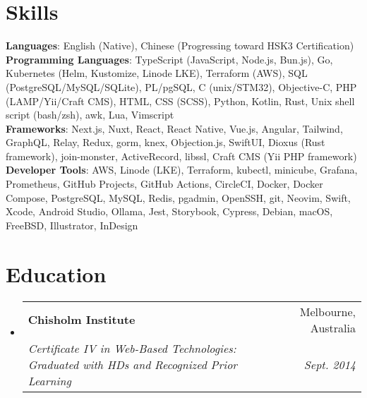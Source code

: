 \documentclass[letterpaper,11pt]{article}
\makeatletter
\newcommand{\resumeSubheading}[4]{
  \vspace{-2pt}\item
    \begin{tabular*}{0.97\textwidth}[t]{l@{\extracolsep{\fill}}r}
      \textbf{#1} & #2 \\
      \textit{\small#3} & \textit{\small #4} \\
    \end{tabular*}\vspace{-6pt}
}
\newcommand{\resumeSubHeadingListStart}{\begin{itemize}[leftmargin=0.15in, label={}]}
\newcommand{\resumeSubHeadingListEnd}{\end{itemize}}
\makeatother
\begin{document}
\section{Skills}
 \begin{itemize}[leftmargin=0.15in, label={}]
    \small{\item{
     \textbf{Languages}{: English (Native), Chinese (Progressing toward HSK3 Certification)} \\
     \textbf{Programming Languages}{: TypeScript (JavaScript, Node.js, Bun.js), Go, Kubernetes (Helm, Kustomize, Linode LKE), Terraform (AWS), SQL (PostgreSQL/MySQL/SQLite), PL/pgSQL, C (unix/STM32), Objective-C, PHP (LAMP/Yii/Craft CMS), HTML, CSS (SCSS), Python, Kotlin, Rust, Unix shell script (bash/zsh), awk, Lua, Vimscript} \\
     \textbf{Frameworks}{: Next.js, Nuxt, React, React Native, Vue.js, Angular, Tailwind, GraphQL, Relay, Redux, gorm, knex, Objection.js, SwiftUI, Dioxus (Rust framework), join-monster, ActiveRecord, libssl, Craft CMS (Yii PHP framework)} \\
     \textbf{Developer Tools}{: AWS, Linode (LKE), Terraform, kubectl, minicube, Grafana, Prometheus, GitHub Projects, GitHub Actions, CircleCI, Docker, Docker Compose, PostgreSQL, MySQL, Redis, pgadmin, OpenSSH, git, Neovim, Swift, Xcode, Android Studio, Ollama, Jest, Storybook, Cypress, Debian, macOS, FreeBSD, Illustrator, InDesign} \\
    }}
 \end{itemize}

\section{Education}
\resumeSubHeadingListStart
  \resumeSubheading
    {Chisholm Institute}{Melbourne, Australia}
    {Certificate IV in Web-Based Technologies: Graduated with HDs and Recognized Prior Learning}{Sept. 2014}
\resumeSubHeadingListEnd
\end{document}

